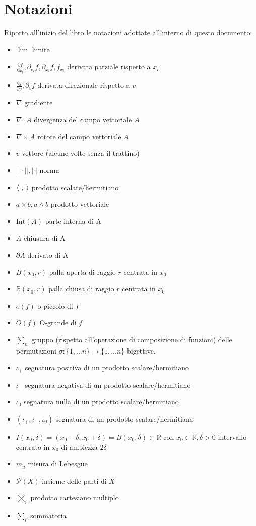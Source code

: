 \documentclass[openany, italian]{book}
\begin{document}
	\chapter*{Notazioni}
	Riporto all'inizio del libro le notazioni adottate all'interno di questo documento:
	\begin{itemize}[label=\hspace{-0.5em}]
		\item $\lim$ limite		
		\item $\frac{\partial f}{\partial x_i}, \partial_{e_i} f, \partial_{x_i} f, f_{x_i}$ derivata parziale rispetto a $x_i$
		\item $\frac{\partial f}{\partial v}, \partial_v f$ derivata direzionale rispetto a $v$
		\item $\nabla$ gradiente
		\item $\nabla \cdot A$ divergenza del campo vettoriale $A$
		\item $\nabla \times A$ rotore del campo vettoriale $A$
		\item $\underline{v}$ vettore (alcune volte senza il trattino)
		\item $||\cdot||, |\cdot|$ norma
		\item $\langle \cdot, \cdot \rangle$ prodotto scalare/hermitiano
		\item $a \times b, a \wedge b$ prodotto vettoriale
		\item $\text{Int}(A)$ parte interna di A
		\item $\bar{A}$ chiusura di A
		\item $\partial A$ derivato di A
		\item $B(x_0, r)$ palla aperta di raggio $r$ centrata in $x_0$
		\item $\mathbb{B}(x_0, r)$ palla chiusa di raggio $r$ centrata in $x_0$
		\item $o(f)$ o-piccolo di $f$
		\item $O(f)$ O-grande di $f$
		\item $\sum_{n}$ gruppo (rispetto all'operazione di composizione di funzioni) delle permutazioni $\sigma: \{1, \ldots n \} \to \{1, \ldots n \}$ bigettive.
		\item $\iota_+$ segnatura positiva di un prodotto scalare/hermitiano
		\item $\iota_-$ segnatura negativa di un prodotto scalare/hermitiano
		\item $\iota_0$ segnatura nulla di un prodotto scalare/hermitiano
		\item $(\iota_+, \iota_-, \iota_0)$ segnatura di un prodotto scalare/hermitiano
		\item $I(x_0, \delta) = (x_0 - \delta, x_0 + \delta) = B(x_0, \delta) \subset \mathbb{R}$ con $x_0 \in \mathbb{R}, \delta > 0$ intervallo centrato in $x_0$ di ampiezza $2\delta$
		\item $m_n$ misura di Lebesgue
		\item $\mathcal{P}(X)$ insieme delle parti di $X$
		\item $\varprod\limits_i$ prodotto cartesiano multiplo
		\item $\sum\limits_i$ sommatoria
	\end{itemize}
\end{document}
